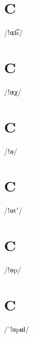 \documentclass[10pt,a4paper,twoside]{book}
\begin{document}
\section*{C}

\begin{multicols}{3}
 {/ǃɶt͡s/} {}
\end{multicols}

\section*{C}

\begin{multicols}{3}
 {/ǃɶχ/} {}
\end{multicols}

\section*{C}

\begin{multicols}{3}
 {/ǃɵ/} {}
\end{multicols}

\section*{C}

\begin{multicols}{3}
 {/ǃɵtʼ/} {}
\end{multicols}

\section*{C}

\begin{multicols}{3}
 {/ǃɵp/} {}
\end{multicols}

\section*{C}

\begin{multicols}{3}
 {/ˈǃɵpʉǁ/} {}
\end{multicols}
\end{document}
